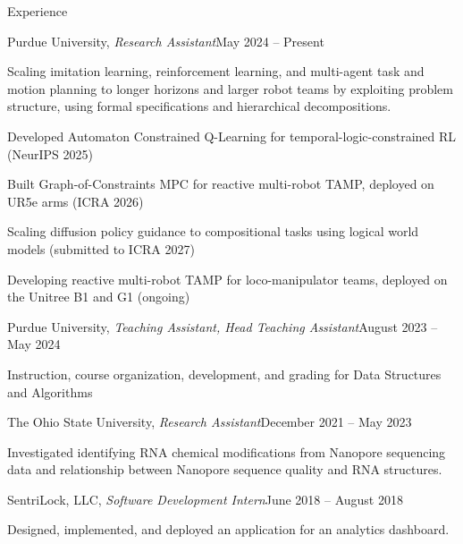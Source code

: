 \documentclass[10pt]{resume}
\begin{document}
\begin{rSection}{Experience}

  \begin{rSubsection}{Purdue University, \textnormal{\textit{Research Assistant}}}{May 2024 -- Present}{}{}
    \item[] Scaling imitation learning, reinforcement learning, and multi-agent task and
      motion planning to longer horizons and larger robot teams by exploiting
      problem structure, using formal specifications and hierarchical decompositions.
    \item Developed Automaton Constrained Q-Learning for temporal-logic-constrained
      RL (NeurIPS 2025)
    \item Built Graph-of-Constraints MPC for reactive multi-robot TAMP, deployed
      on UR5e arms (ICRA 2026)
    \item Scaling diffusion policy guidance to compositional tasks using logical
      world models (submitted to ICRA 2027)
    \item Developing reactive multi-robot TAMP for loco-manipulator teams, deployed on
      the Unitree B1 and G1 (ongoing)
  \end{rSubsection}

  \begin{rSubsection}{Purdue University, \textnormal{\textit{Teaching Assistant, Head Teaching Assistant}}}{August 2023 -- May 2024}{}{}
    \item Instruction, course organization, development, and grading for Data Structures
      and Algorithms
  \end{rSubsection}

  \begin{rSubsection}{The Ohio State University, \textnormal{\textit{Research Assistant}}}{December 2021 -- May 2023}{}{}
    \item Investigated identifying RNA chemical modifications from Nanopore sequencing
      data and relationship between Nanopore sequence quality and RNA structures.
  \end{rSubsection}

  \begin{rSubsection}{SentriLock, LLC, \textnormal{\textit{Software Development Intern}}}{June 2018 -- August 2018}{}{}
    \item Designed, implemented, and deployed an application for an analytics
      dashboard. %
  \end{rSubsection}

\end{rSection}
\end{document}
